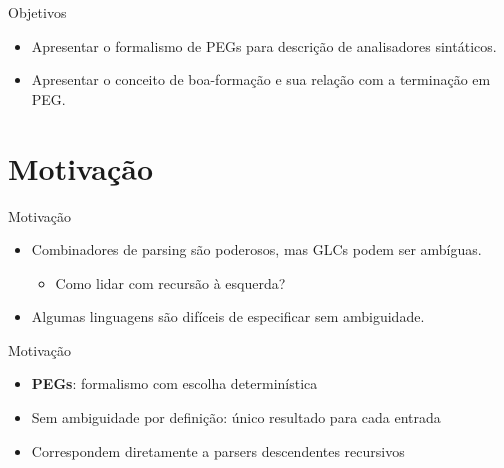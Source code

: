 \subtitle{\bf Aula 7 - Motivação}
\begin{frame}[t,plain]
    \titlepage
\end{frame}

\begin{frame}{Objetivos}

    \begin{itemize}
        \item
        Apresentar o formalismo de PEGs para descrição de analisadores
        sintáticos.
        \item
        Apresentar o conceito de boa-formação e sua relação com a terminação
        em PEG.
    \end{itemize}
\end{frame}


\section{Motivação}\label{motivauxe7uxe3o}

\begin{frame}{Motivação}

    \begin{itemize}

        \item
        Combinadores de parsing são poderosos, mas GLCs podem ser ambíguas.

        \begin{itemize}

            \item
            Como lidar com recursão à esquerda?
        \end{itemize}
        \item
        Algumas linguagens são difíceis de especificar sem ambiguidade.
    \end{itemize}
\end{frame}

\begin{frame}{Motivação}

    \begin{itemize}

        \item
        \textbf{PEGs}: formalismo com escolha determinística
        \item
        Sem ambiguidade por definição: único resultado para cada entrada
        \item
        Correspondem diretamente a parsers descendentes recursivos
    \end{itemize}
\end{frame}

